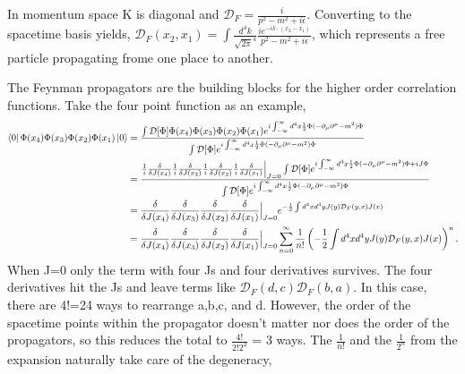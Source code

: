 In momentum space K is diagonal and $\mathcal{D}_F = \frac{i}{p^2-m^2 + i\epsilon}$. Converting to the spacetime basis yields, $\mathcal{D}_F(x_2,x_1) = \int \frac{d^4k}{\sqrt{2\pi}^4}\frac{i e^{-ik\cdot(x_2-x_1)}}{p^2-m^2 + i\epsilon}$, which represents a free particle propagating frome one place to another.  

The Feynman propagators are the building blocks for the higher order correlation functions. Take the four point function as an example,
\begin{equation}
\begin{split}
\bra{0}\Phi(x_4)\Phi(x_3)\Phi(x_2)\Phi(x_1)\ket{0} &= 
\frac{\int \mathcal{D}[\Phi]\Phi(x_4)\Phi(x_3)\Phi(x_2)\Phi(x_1)e^{i\int_{-\infty}^{\infty} d^4x \frac{1}{2}\Phi (-\partial_\mu\partial^\mu - m^2)\Phi}}
{\int \mathcal{D}[\Phi]e^{i\int_{-\infty}^{\infty} d^4x \frac{1}{2}\Phi (-\partial_\mu\partial^\mu - m^2)\Phi}} \\
&= \frac{\frac{1}{i}\frac{\delta}{\delta J(x_4)}\frac{1}{i}\frac{\delta}{\delta J(x_3)}\frac{1}{i}\frac{\delta}{\delta J(x_2)}\frac{1}{i}\frac{\delta}{\delta J(x_1)}\Big|_{J=0}\int \mathcal{D}[\Phi]e^{i\int_{-\infty}^{\infty} d^4x \frac{1}{2}\Phi (-\partial_\mu\partial^\mu - m^2)\Phi + iJ\Phi}}
{\int \mathcal{D}[\Phi]e^{i\int_{-\infty}^{\infty} d^4x \frac{1}{2}\Phi (-\partial_\mu\partial^\mu - m^2)\Phi}} \\
&= \frac{\delta}{\delta J(x_4)}\frac{\delta}{\delta J(x_3)}\frac{\delta}{\delta J(x_2)}\frac{\delta}{\delta J(x_1)}\Big|_{J=0}e^{-\frac{1}{2}\int d^4x d^4y J(y) \mathcal{D}_F(y,x) J(x)} \\
&= \frac{\delta}{\delta J(x_4)}\frac{\delta}{\delta J(x_3)}\frac{\delta}{\delta J(x_2)}\frac{\delta}{\delta J(x_1)}\Big|_{J=0} 
\sum_{n=0}^\infty \frac{1}{n!}\left( -\frac{1}{2}\int d^4x d^4y J(y) \mathcal{D}_F(y,x) J(x) \right)^n. 
\end{split}
\end{equation}
When J=0 only the term with four Js and four derivatives survives. The four derivatives hit the Js and leave terms like $\mathcal{D}_F(d,c) \mathcal{D}_F(b,a)$. In this case, there are 4!=24 ways to rearrange a,b,c, and d. However, the order of the spacetime points within the propagator doesn't matter nor does the order of the propagators, so this reduces the total to $\frac{4!}{2!2^2}$ = 3 ways. The $\frac{1}{n!}$ and the $\frac{1}{2^n}$ from the expansion naturally take care of the degeneracy,
